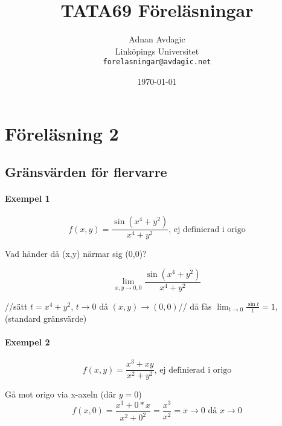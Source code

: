 \documentclass{article}
\title{TATA69 Föreläsningar}
\author{Adnan Avdagic\\
	Linköpings Universitet\\
	\texttt{forelasningar@avdagic.net}}
\date{\today}
\begin{document}
\begin{titlepage}
\thispagestyle{empty}
\maketitle
\end{titlepage}

\tableofcontents
{}
\thispagestyle{empty}

\newpage
\cleardoublepage
{}
\setcounter{page}{1}
\setcounter{section}{1}
\pagestyle{fancy}
\fancyhf{}
\rfoot{\rightmark}
\noindent
\section{Föreläsning 2}
\subsection{Gränsvärden för flervarre}

\paragraph{Exempel 1} \flushleft
\begin{equation} \label{eq:1}
	f(x,y) = \frac{\sin(x^4+y^2)}{x^4+y^2} \text{, ej definierad i origo}
\end{equation}

Vad händer då (x,y) närmar sig (0,0)?

$$\lim_{x,y \rightarrow 0,0} \frac{\sin(x^4+y^2)}{x^4+y^2}$$

//sätt $t= \displaystyle x^4+y^2$, ${t \rightarrow 0}$ då ${(x,y) \rightarrow (0,0)}$// \newline
då fås \(\displaystyle \lim_{t \rightarrow 0} \frac{\sin t}{t} = 1,\) (standard gränsvärde) \newline

\paragraph{Exempel 2} \flushleft
\begin{equation} \label{eq:2}
	f(x,y) = \frac{x^3+xy}{x^2+y^2} \text{, ej definierad i origo}
\end{equation}

Gå mot origo via x-axeln (där $y=0$)
\[f(x,0) = \frac{x^3+0*x}{x^2+0^2} = \frac{x^3}{x^2} =  {x \rightarrow 0} \text{ då } {x \rightarrow 0}\]
\end{document}
